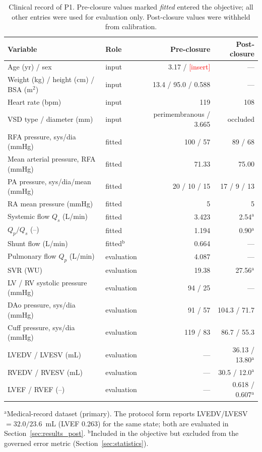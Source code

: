 \begin{table}[ht]
\centering\small
\caption{Clinical record of P1. Pre-closure values marked \emph{fitted} entered the objective; all other entries were used for evaluation only. Post-closure values were withheld from calibration.}
\label{tab:patient_data}
\begin{tabular}{llrr}
\toprule
\textbf{Variable} & \textbf{Role} & \textbf{Pre-closure} & \textbf{Post-closure} \\
\midrule
Age (yr) / sex & input & 3.17 / \textcolor{red}{[insert]} & --- \\
Weight (kg) / height (cm) / BSA (m$^2$) & input & 13.4 / 95.0 / 0.588 & --- \\
Heart rate (bpm) & input & 119 & 108 \\
VSD type / diameter (mm) & input & perimembranous / 3.665 & occluded \\
\midrule
RFA pressure, sys/dia (mmHg) & fitted & 100 / 57 & 89 / 68 \\
Mean arterial pressure, RFA (mmHg) & fitted & 71.33 & 75.00 \\
PA pressure, sys/dia/mean (mmHg) & fitted & 20 / 10 / 15 & 17 / 9 / 13 \\
RA mean pressure (mmHg) & fitted & 5 & 5 \\
Systemic flow $Q_s$ (L/min) & fitted & 3.423 & 2.54$^{\mathrm{a}}$ \\
$Q_p/Q_s$ (--) & fitted & 1.194 & 0.90$^{\mathrm{a}}$ \\
Shunt flow (L/min) & fitted$^{\mathrm{b}}$ & 0.664 & --- \\
\midrule
Pulmonary flow $Q_p$ (L/min) & evaluation & 4.087 & --- \\
SVR (WU) & evaluation & 19.38 & 27.56$^{\mathrm{a}}$ \\
LV / RV systolic pressure (mmHg) & evaluation & 94 / 25 & --- \\
DAo pressure, sys/dia (mmHg) & evaluation & 91 / 57 & 104.3 / 71.7 \\
Cuff pressure, sys/dia (mmHg) & evaluation & 119 / 83 & 86.7 / 55.3 \\
LVEDV / LVESV (mL) & evaluation & --- & 36.13 / 13.80$^{\mathrm{a}}$ \\
RVEDV / RVESV (mL) & evaluation & --- & 30.5 / 12.0$^{\mathrm{a}}$ \\
LVEF / RVEF (--) & evaluation & --- & 0.618 / 0.607$^{\mathrm{a}}$ \\
\bottomrule
\end{tabular}
\par\vspace{2pt}
\footnotesize{$^{\mathrm{a}}$Medical-record dataset (primary). The protocol form reports LVEDV/LVESV $=32.0/23.6$~mL (LVEF 0.263) for the same state; both are evaluated in Section~\ref{sec:results_post}. $^{\mathrm{b}}$Included in the objective but excluded from the governed error metric (Section~\ref{sec:statistics}).}
\end{table}

